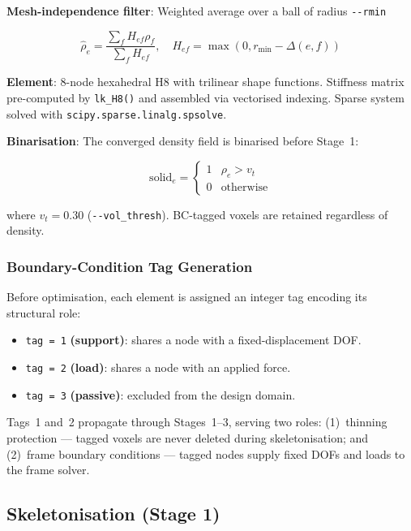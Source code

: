 \documentclass[a4paper, 11pt, openany]{report}
\begin{document}
\textbf{Mesh-independence filter}: Weighted average over a ball of radius
\texttt{-{}-rmin}

\begin{equation}
\label{eq:filter}
\hat{\rho}_e = \frac{\sum_{f} H_{ef} \rho_f}{\sum_f H_{ef}}, \quad
H_{ef} = \max(0, r_{\min} - \Delta(e,f))
\end{equation}

\textbf{Element}: 8-node hexahedral H8 with trilinear shape functions.
Stiffness matrix pre-computed by \texttt{lk\_H8()} and assembled via
vectorised indexing.  Sparse system solved with
\texttt{scipy.sparse.linalg.spsolve}.

\textbf{Binarisation}: The converged density field is binarised before Stage~1:

\begin{equation}
\label{eq:binarise}
\text{solid}_e =
\begin{cases}
1 & \rho_e > v_t \\
0 & \text{otherwise}
\end{cases}
\end{equation}

where $v_t = 0.30$ (\texttt{-{}-vol\_thresh}).  BC-tagged voxels are retained
regardless of density.

\subsubsection{Boundary-Condition Tag Generation}

Before optimisation, each element is assigned an integer tag encoding its
structural role:

\begin{itemize}[nosep]
    \item \texttt{tag = 1} \textbf{(support)}: shares a node with a
          fixed-displacement DOF.
    \item \texttt{tag = 2} \textbf{(load)}: shares a node with an applied force.
    \item \texttt{tag = 3} \textbf{(passive)}: excluded from the design domain.
\end{itemize}

Tags~1 and~2 propagate through Stages~1--3, serving two roles:
(1)~thinning protection --- tagged voxels are never deleted during
skeletonisation; and (2)~frame boundary conditions --- tagged nodes supply
fixed DOFs and loads to the frame solver.


\subsection{Skeletonisation (Stage 1)}
\label{sec:alg-skeleton}
\end{document}
